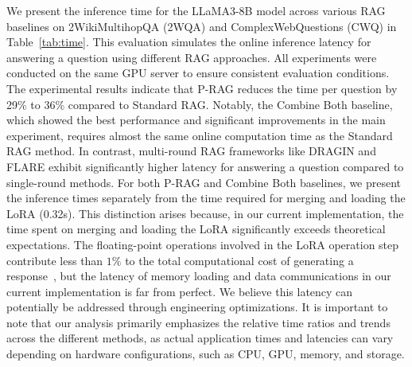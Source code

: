 \documentclass[sigconf,natbib=true,anonymous=false]{acmart}
\begin{document}
We present the inference time for the LLaMA3-8B model across various RAG baselines on 2WikiMultihopQA (2WQA) and ComplexWebQuestions (CWQ) in Table~\ref{tab:time}. 
This evaluation simulates the online inference latency for answering a question using different RAG approaches. 
All experiments were conducted on the same GPU server to ensure consistent evaluation conditions.
The experimental results indicate that P-RAG reduces the time per question by 29\% to 36\% compared to Standard RAG. Notably, the Combine Both baseline, which showed the best performance and significant improvements in the main experiment, requires almost the same online computation time as the Standard RAG method.
In contrast, multi-round RAG frameworks like DRAGIN and FLARE exhibit significantly higher latency for answering a question compared to single-round methods.
For both P-RAG and Combine Both baselines, we present the inference times separately from the time required for merging and loading the LoRA (0.32s). 
This distinction arises because, in our current implementation, the time spent on merging and loading the LoRA significantly exceeds theoretical expectations. 
The floating-point operations involved in the LoRA operation step contribute less than $1\%$ to the total computational cost of generating a response~\cite{hulora}, but the latency of memory loading and data communications in our current implementation is far from perfect.
We believe this latency can potentially be addressed through engineering optimizations. 
It is important to note that our analysis primarily emphasizes the relative time ratios and trends across the different methods, as actual application times and latencies can vary depending on hardware configurations, such as CPU, GPU, memory, and storage.
\end{document}
